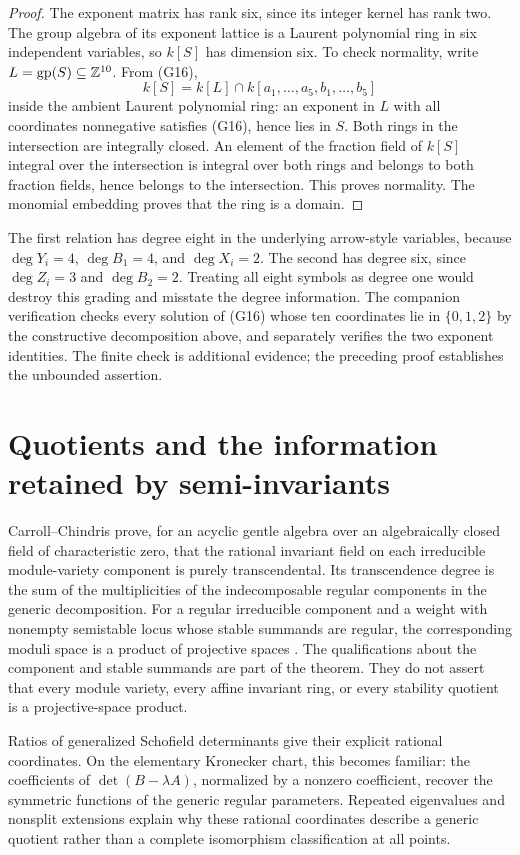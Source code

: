 \begin{proof}
The exponent matrix has rank six, since its integer kernel has rank two. The group algebra of its exponent lattice is a Laurent polynomial ring in six independent variables, so \(k[S]\) has dimension six. To check normality, write \(L=\operatorname{gp}(S)\subseteq\mathbb{Z}^{10}\). From (G16),
\[
 k[S]=k[L]\cap k[a_1,\ldots,a_5,b_1,\ldots,b_5]
\]
inside the ambient Laurent polynomial ring: an exponent in \(L\) with all coordinates nonnegative satisfies (G16), hence lies in \(S\). Both rings in the intersection are integrally closed. An element of the fraction field of \(k[S]\) integral over the intersection is integral over both rings and belongs to both fraction fields, hence belongs to the intersection. This proves normality. The monomial embedding proves that the ring is a domain.
\end{proof}

The first relation has degree eight in the underlying arrow-style variables, because \(\deg Y_i=4\), \(\deg B_1=4\), and \(\deg X_i=2\). The second has degree six, since \(\deg Z_i=3\) and \(\deg B_2=2\). Treating all eight symbols as degree one would destroy this grading and misstate the degree information. The companion verification checks every solution of (G16) whose ten coordinates lie in \(\{0,1,2\}\) by the constructive decomposition above, and separately verifies the two exponent identities. The finite check is additional evidence; the preceding proof establishes the unbounded assertion.

\section{Quotients and the information retained by semi-invariants}
Carroll--Chindris prove, for an acyclic gentle algebra over an algebraically closed field of characteristic zero, that the rational invariant field on each irreducible module-variety component is purely transcendental. Its transcendence degree is the sum of the multiplicities of the indecomposable regular components in the generic decomposition. For a regular irreducible component and a weight with nonempty semistable locus whose stable summands are regular, the corresponding moduli space is a product of projective spaces \citep[Theorem 1]{GICarrollChindris2013}. The qualifications about the component and stable summands are part of the theorem. They do not assert that every module variety, every affine invariant ring, or every stability quotient is a projective-space product.

Ratios of generalized Schofield determinants give their explicit rational coordinates. On the elementary Kronecker chart, this becomes familiar: the coefficients of \(\det(B-\lambda A)\), normalized by a nonzero coefficient, recover the symmetric functions of the generic regular parameters. Repeated eigenvalues and nonsplit extensions explain why these rational coordinates describe a generic quotient rather than a complete isomorphism classification at all points.

